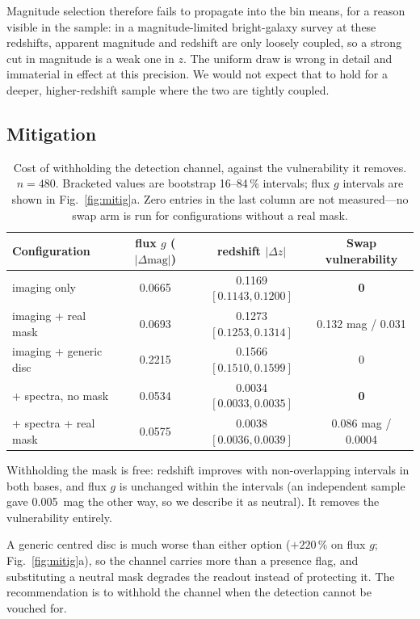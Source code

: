 \documentclass[11pt]{article}
\newcommand{\dmag}{|\Delta\mathrm{mag}|}
\begin{document}
Magnitude selection therefore fails to propagate into the bin means, for a reason visible in the
sample: in a magnitude-limited bright-galaxy survey at these redshifts, apparent magnitude and
redshift are only loosely coupled, so a strong cut in magnitude is a weak one in $z$. The
uniform draw is wrong in detail and immaterial in effect at this precision. We would not expect
that to hold for a deeper, higher-redshift sample where the two are tightly coupled.

\subsection{Mitigation}

\begin{table}[H]
\centering\small
\caption{Cost of withholding the detection channel, against the vulnerability it removes.
$n=480$. Bracketed values are bootstrap 16--84\,\% intervals; flux $g$ intervals are shown in
Fig.~\ref{fig:mitig}a. Zero entries in the last column are not measured---no swap arm is run for
configurations without a real mask.}
\label{tab:mitig}
\begin{tabular}{lccc}
\toprule
Configuration & flux $g$ ($\dmag$) & redshift $|\Delta z|$ & Swap vulnerability \\
\midrule
imaging only            & 0.0665 & 0.1169 $[0.1143,0.1200]$ & \textbf{0} \\
imaging + real mask     & 0.0693 & 0.1273 $[0.1253,0.1314]$ & 0.132 mag / 0.031 \\
imaging + generic disc  & 0.2215 & 0.1566 $[0.1510,0.1599]$ & 0 \\
+ spectra, no mask      & 0.0534 & 0.0034 $[0.0033,0.0035]$ & \textbf{0} \\
+ spectra + real mask   & 0.0575 & 0.0038 $[0.0036,0.0039]$ & 0.086 mag / 0.0004 \\
\bottomrule
\end{tabular}
\end{table}

Withholding the mask is free: redshift improves with non-overlapping intervals in both bases,
and flux $g$ is unchanged within the intervals (an independent sample gave \SI{0.005}{mag} the
other way, so we describe it as neutral). It removes the vulnerability entirely.

A generic centred disc is much worse than either option ($+220\,\%$ on flux $g$;
Fig.~\ref{fig:mitig}a), so the channel carries more than a presence flag, and
substituting a neutral mask degrades the readout instead of protecting it. The recommendation is
to withhold the channel when the detection cannot be vouched for.
\end{document}
